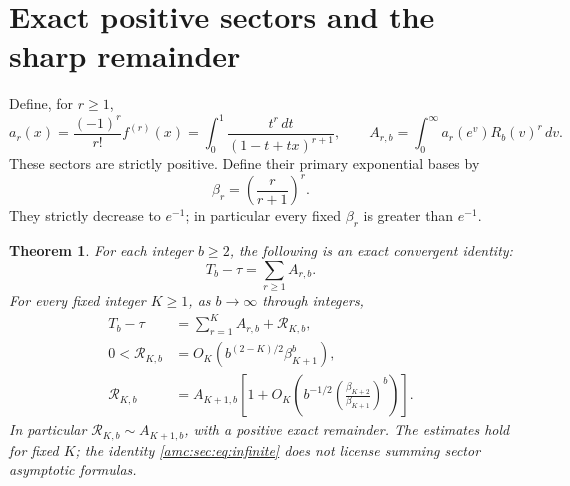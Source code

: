\documentclass[11pt,letterpaper]{article}
\newtheorem{theorem}{Theorem}[section]
\theoremstyle{remark}\newtheorem{remark}[theorem]{Remark}
\newcommand{\RR}{\mathcal R}
\begin{document}
\section{Exact positive sectors and the sharp remainder}
Define, for $r\ge1$,
\begin{equation}\label{amc:sec:eq:sector}
 a_r(x)=\frac{(-1)^r}{r!}f^{(r)}(x)
       =\int_0^1\frac{t^r\,dt}{(1-t+tx)^{r+1}},\qquad
 A_{r,b}=\int_0^\infty a_r(e^v)R_b(v)^r\,dv.
\end{equation}
These sectors are strictly positive. Define their primary exponential bases by
\begin{equation}\label{amc:sec:eq:beta}
 \beta_r=\left(\frac r{r+1}\right)^r.
\end{equation}
They strictly decrease to $e^{-1}$; in particular every fixed $\beta_r$ is greater than $e^{-1}$.

\begin{theorem}\label{amc:sec:thm:exact}
For each integer $b\ge2$, the following is an exact convergent identity:
\begin{equation}\label{amc:sec:eq:infinite}
 T_b-\tau=\sum_{r\ge1}A_{r,b}.
\end{equation}
For every fixed integer $K\ge1$, as $b\to\infty$ through integers,
\begin{align}
 T_b-\tau&=\sum_{r=1}^K A_{r,b}+\RR_{K,b},\label{amc:sec:eq:remainder}\\
 0<\RR_{K,b}&=O_K\!\left(b^{(2-K)/2}\beta_{K+1}^b\right),\label{amc:sec:eq:order}\\
 \RR_{K,b}&=A_{K+1,b}
 \left[1+O_K\!\left(b^{-1/2}
 \left(\frac{\beta_{K+2}}{\beta_{K+1}}\right)^b\right)\right].\label{amc:sec:eq:equivalence}
\end{align}
In particular $\RR_{K,b}\sim A_{K+1,b}$, with a positive exact remainder. The estimates hold for fixed $K$; the identity \eqref{amc:sec:eq:infinite} does not license summing sector asymptotic formulas.
\end{theorem}
\end{document}
